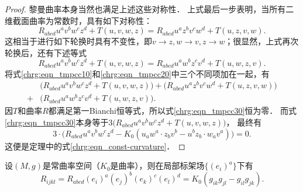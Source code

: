 \begin{proof}
    黎曼曲率本身当然也满足上述这些对称性．
    上式最后一步表明，当所有二维截面曲率为常数时，具有如下对称性：
    \begin{equation}\label{chrg:eqn_tmpcc10}
        R_{abcd}u^a v^b w^c z^d  + T(u,v,w,z) = R_{abcd}u^a z^b v^c w^d  + T(u,z,v,w).
    \end{equation}
    这相当于进行如下轮换时具有不变性，即$v\to z, w\to v, z\to w$；很显然，上式再次轮换后，还有下述等式
    \begin{equation}\label{chrg:eqn_tmpcc20}
        R_{abcd}u^a v^b w^c z^d  + T(u,v,w,z) = R_{abcd}u^a w^b z^c v^d  + T(u,w,z,v).
    \end{equation}
    将式\eqref{chrg:eqn_tmpcc10}和\eqref{chrg:eqn_tmpcc20}中三个不同项加在一起，有
    \begin{equation}\label{chrg:eqn_tmpcc30}
      \begin{aligned}
         &\bigl(R_{abcd}u^a v^b w^c z^d  + T(u,v,w,z)\bigr)+  \bigl(R_{abcd}u^a z^b v^c w^d  + T(u,z,v,w)\bigr) \\
         +& \bigl( R_{abcd}u^a w^b z^c v^d  + T(u,w,z,v)\bigr) .
      \end{aligned}
    \end{equation}
    因$T$和曲率$R$都满足第一Bianchi恒等式，所以式\eqref{chrg:eqn_tmpcc30}恒为零．
    而式\eqref{chrg:eqn_tmpcc30}本身等于$3\bigl(R_{abcd}u^a v^b w^c z^d  + T(u,v,w,z)\bigr)$，
    最终有
    \begin{equation}
        3\cdot \bigl(R_{abcd} u^a v^b w^c z^d  - K_0 ( u_a w^a\cdot  z_b v^b   - u^bz_b \cdot w_a v^a  ) \bigr)= 0.
    \end{equation}
    这便是定理中的式\eqref{chrg:eqn_const-curvature}．
\end{proof}

\begin{corollary}\label{chrg:thm_const-curvature-component}
    设$(M,g)$是常曲率空间（$K_0$是曲率），则在局部标架场$\{(e_i)^a\}$下有
    \begin{equation}\label{chrg:eqn_const-curvature-component}
        R_{ijkl}= R_{abcd} (e_i)^a (e_j)^b (e_k)^c (e_l)^d
        = K_0 ( g_{ik}g_{jl}- g_{il}g_{jk}  ).
    \end{equation}
\end{corollary}

